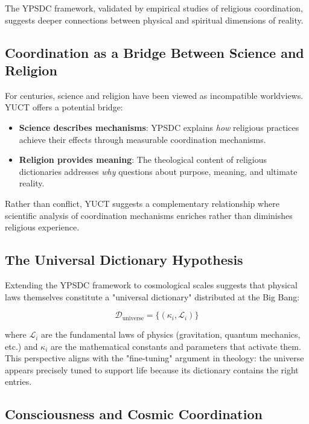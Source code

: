 \documentclass[12pt,a4paper]{article}
\begin{document}
	The YPSDC framework, validated by empirical studies of religious coordination, suggests deeper connections between physical and spiritual dimensions of reality.
	
	\subsection{Coordination as a Bridge Between Science and Religion}
	
	For centuries, science and religion have been viewed as incompatible worldviews. YUCT offers a potential bridge:
	
	\begin{itemize}
		\item \textbf{Science describes mechanisms}: YPSDC explains \textit{how} religious practices achieve their effects through measurable coordination mechanisms.
		
		\item \textbf{Religion provides meaning}: The theological content of religious dictionaries addresses \textit{why} questions about purpose, meaning, and ultimate reality.
	\end{itemize}
	
	Rather than conflict, YUCT suggests a complementary relationship where scientific analysis of coordination mechanisms enriches rather than diminishes religious experience.
	
	\subsection{The Universal Dictionary Hypothesis}
	
	Extending the YPSDC framework to cosmological scales suggests that physical laws themselves constitute a "universal dictionary" distributed at the Big Bang:
	
	\[
	\mathcal{D}_{\mathrm{universe}} = \{ (\kappa_i, \mathcal{L}_i) \}
	\]
	
	where $\mathcal{L}_i$ are the fundamental laws of physics (gravitation, quantum mechanics, etc.) and $\kappa_i$ are the mathematical constants and parameters that activate them. This perspective aligns with the "fine-tuning" argument in theology: the universe appears precisely tuned to support life because its dictionary contains the right entries.
	
	\subsection{Consciousness and Cosmic Coordination}
	
\end{document}
